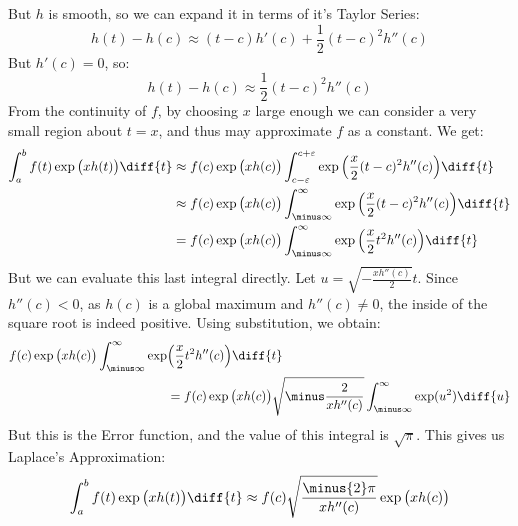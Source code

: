 \documentclass[crop=false,class=book,oneside]{standalone}
\begin{document}
        But $h$ is smooth, so we can expand it in terms of it's
        Taylor Series:
        \begin{equation}
            h(t)-h(c)\approx(t-c)h'(c)+\frac{1}{2}(t-c)^{2}h''(c)
        \end{equation}
        But $h'(c)=0$, so:
        \begin{equation}
            h(t)-h(c)\approx\frac{1}{2}(t-c)^{2}h''(c)
        \end{equation}
        From the continuity of $f$, by choosing $x$ large enough we
        can consider a very small region about $t=x$, and thus may
        approximate $f$ as a constant. We get:
        \begin{subequations}
            \begin{align}
                \int_{a}^{b}f(t)\exp\big(xh(t)\big)\diff{t}
                &\approx{f}(c)\exp\big(xh(c)\big)
                    \int_{c-\varepsilon}^{c+\varepsilon}
                    \exp\Big(\frac{x}{2}(t-c)^{2}h''(c)\Big)\diff{t}\\
                &\approx{f}(c)\exp\big(xh(c)\big)
                    \int_{\minus\infty}^{\infty}
                    \exp\Big(\frac{x}{2}(t-c)^{2}h''(c)\Big)\diff{t}\\
                &=f(c)\exp\big(xh(c)\big)\int_{\minus\infty}^{\infty}
                    \exp\Big(\frac{x}{2}t^{2}h''(c)\Big)\diff{t}
            \end{align}
        \end{subequations}
        But we can evaluate this last integral directly. Let
        $u=\sqrt{\minus\frac{xh''(c)}{2}}t$. Since $h''(c)<0$, as
        $h(c)$ is a global maximum and $h''(c)\ne{0}$, the inside of
        the square root is indeed positive. Using substitution, we
        obtain:
        \begin{equation}
            \begin{split}
                f(c)\exp\big(xh(c)\big)\int_{\minus\infty}^{\infty}
                    \exp&\Big(\frac{x}{2}t^{2}h''(c)\Big)\diff{t}\\
                &=f(c)\exp\big(xh(c)\big)
                \sqrt{\minus\frac{2}{xh''(c)}}
                \int_{\minus\infty}^{\infty}\exp(u^{2})\diff{u}
            \end{split}
        \end{equation}
        But this is the Error function, and the value of this integral
        is $\sqrt{\pi}$. This gives us Laplace's Approximation:
        \begin{equation}
            \int_{a}^{b}f(t)\exp\big(xh(t)\big)\diff{t}
            \approx{f}(c)\sqrt{\frac{\minus{2}\pi}{xh''(c)}}
            \exp\big(xh(c)\big)
        \end{equation}
\end{document}
